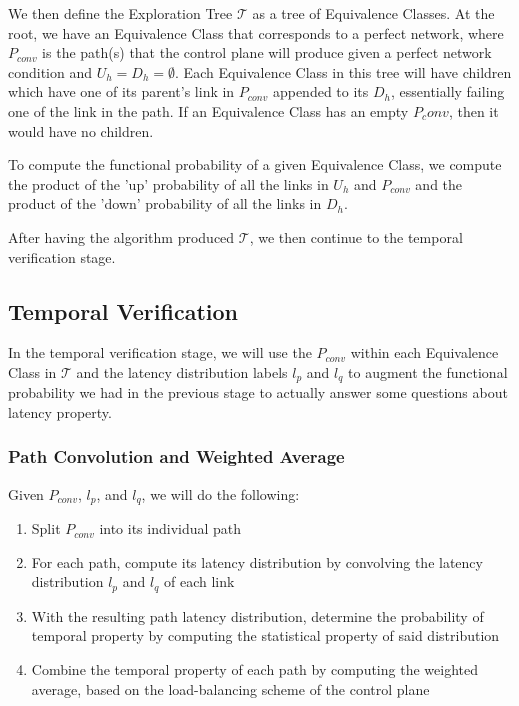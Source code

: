 \documentclass[10pt,sigconf,letterpaper,anonymous,nonacm]{acmart}
\begin{document}
We then define the Exploration Tree $\mathcal{T}$ as a tree of Equivalence Classes.
At the root, we have an Equivalence Class that corresponds to a perfect network, where $P_{conv}$ 
is the path(s) that the control plane will produce given a perfect network condition and 
$U_h = D_h = \emptyset$.
Each Equivalence Class in this tree will have children which have one of its parent's link in 
$P_{conv}$ appended to its $D_h$, essentially failing one of the link in the path.
If an Equivalence Class has an empty $P_conv$, then it would have no children.

To compute the functional probability of a given Equivalence Class, we compute the product 
of the 'up' probability of all the links in $U_h$ and $P_{conv}$ and the product of the 'down'
probability of all the links in $D_h$.

After having the algorithm produced $\mathcal{T}$, we then continue to the temporal verification 
stage.

\subsection{Temporal Verification}
In the temporal verification stage, we will use the $P_{conv}$ within each Equivalence Class in 
$\mathcal{T}$ and the latency distribution labels $l_p$ and $l_q$ to augment the functional 
probability we had in the previous stage to actually answer some questions about latency property.

\subsubsection{Path Convolution and Weighted Average}
Given $P_{conv}$, $l_p$, and $l_q$, we will do the following:
\begin{enumerate}
    \item Split $P_{conv}$ into its individual path
    \item For each path, compute its latency distribution by convolving the latency distribution 
        $l_p$ and $l_q$ of each link
    \item With the resulting path latency distribution, determine the probability of temporal 
        property by computing the statistical property of said distribution
    \item Combine the temporal property of each path by computing the weighted average, based 
        on the load-balancing scheme of the control plane
\end{enumerate}
\end{document}
